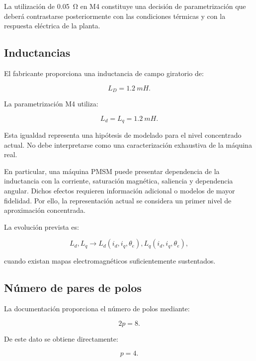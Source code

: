 La utilización de \SI{0.05}{\ohm} en M4 constituye una decisión de parametrización que deberá contrastarse posteriormente con las condiciones térmicas y con la respuesta eléctrica de la planta.

\subsection{Inductancias}

El fabricante proporciona una inductancia de campo giratorio de:

\begin{equation}
L_D=\SI{1.2}{mH}.
\end{equation}

La parametrización M4 utiliza:

\begin{equation}
L_d=L_q=\SI{1.2}{mH}.
\end{equation}

Esta igualdad representa una hipótesis de modelado para el nivel concentrado actual. No debe interpretarse como una caracterización exhaustiva de la máquina real.

En particular, una máquina PMSM puede presentar dependencia de la inductancia con la corriente, saturación magnética, saliencia y dependencia angular. Dichos efectos requieren información adicional o modelos de mayor fidelidad. Por ello, la representación actual se considera un primer nivel de aproximación concentrada.

La evolución prevista es:

\begin{equation}
L_d,L_q
\longrightarrow
L_d(i_d,i_q,\theta_e),
L_q(i_d,i_q,\theta_e),
\end{equation}

cuando existan mapas electromagnéticos suficientemente sustentados.

\subsection{Número de pares de polos}

La documentación proporciona el número de polos mediante:

\begin{equation}
2p=8.
\end{equation}

De este dato se obtiene directamente:

\begin{equation}
p=4.
\end{equation}

